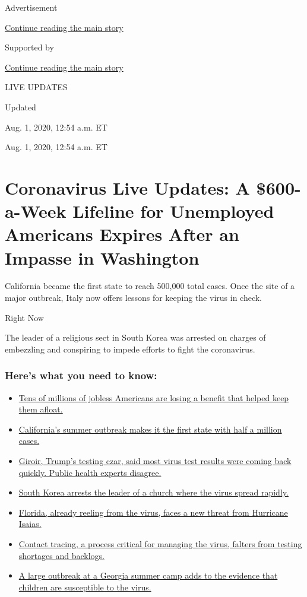 Advertisement

\protect\hyperlink{after-top}{Continue reading the main story}

Supported by

\protect\hyperlink{after-sponsor}{Continue reading the main story}

LIVE UPDATES

Updated~

Aug. 1, 2020, 12:54 a.m. ET

Aug. 1, 2020, 12:54 a.m. ET

\hypertarget{coronavirus-live-updates-a-600-a-week-lifeline-for-unemployed-americans-expires-after-an-impasse-in-washington}{%
\section{Coronavirus Live Updates: A \$600-a-Week Lifeline for
Unemployed Americans Expires After an Impasse in
Washington}\label{coronavirus-live-updates-a-600-a-week-lifeline-for-unemployed-americans-expires-after-an-impasse-in-washington}}

California became the first state to reach 500,000 total cases. Once the
site of a major outbreak, Italy now offers lessons for keeping the virus
in check.

Right Now

The leader of a religious sect in South Korea was arrested on charges of
embezzling and conspiring to impede efforts to fight the coronavirus.

\hypertarget{heres-what-you-need-to-know}{%
\subsubsection{Here's what you need to
know:}\label{heres-what-you-need-to-know}}

\begin{itemize}
\tightlist
\item
  \protect\hyperlink{link-7c4d159d}{Tens of millions of jobless
  Americans are losing a benefit that helped keep them afloat.}
\item
  \protect\hyperlink{link-4e17d805}{California's summer outbreak makes
  it the first state with half a million cases.}
\item
  \protect\hyperlink{link-65fa7f74}{Giroir, Trump's testing czar, said
  most virus test results were coming back quickly. Public health
  experts disagree.}
\item
  \protect\hyperlink{link-2b88e858}{South Korea arrests the leader of a
  church where the virus spread rapidly.}
\item
  \protect\hyperlink{link-3bb771a7}{Florida, already reeling from the
  virus, faces a new threat from Hurricane Isaias.}
\item
  \protect\hyperlink{link-747b61fb}{Contact tracing, a process critical
  for managing the virus, falters from testing shortages and backlogs.}
\item
  \protect\hyperlink{link-19b57b6f}{A large outbreak at a Georgia summer
  camp adds to the evidence that children are susceptible to the virus.}
\end{itemize}

